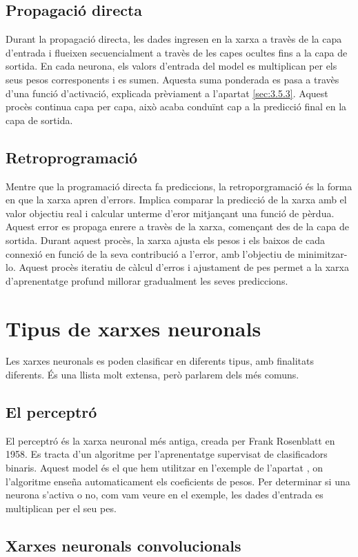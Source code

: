 \subsection{Propagació directa}
Durant la propagació directa, les dades ingresen en la xarxa a travès de la capa d'entrada i flueixen secuencialment a travès de les capes ocultes fins a la capa de sortida. En cada neurona, els valors d'entrada del model es multiplican per els seus pesos corresponents i es sumen. Aquesta suma ponderada es pasa a travès d'una funció d'activació, explicada prèviament a l'apartat \ref{sec:3.5.3}. Aquest procès continua capa per capa, això acaba conduïnt cap a la predicció final en la capa de sortida.
\subsection{Retroprogramació}\label{sec:3.6.1}
Mentre que la programació directa fa prediccions, la retroporgramació és la forma en que la xarxa apren d'errors. Implica comparar la predicció de la xarxa amb el valor objectiu real i calcular unterme d'eror mitjançant una funció de pèrdua.
Aquest error es propaga enrere a travès de la xarxa, començant des de la capa de sortida. Durant aquest procès, la xarxa ajusta els pesos i els baixos de cada connexió en funció de la seva contribució a l'error, amb l'objectiu de minimitzar-lo.
Aquest procès iteratiu de càlcul d'erros i ajustament de pes permet a la xarxa d'aprenentatge profund millorar gradualment les seves prediccions.

\section{Tipus de xarxes neuronals}
Les xarxes neuronals es poden clasificar en diferents tipus, amb finalitats diferents. És una llista molt extensa, però parlarem dels més comuns.
\subsection{El perceptró}
El perceptró és la xarxa neuronal més antiga, creada per Frank Rosenblatt en 1958. Es tracta d'un algoritme per l'aprenentatge supervisat de clasificadors binaris. Aquest model és el que hem utilitzar en l'exemple de l'apartat \label{sec:3.7}, on l'algoritme enseña automaticament els coeficients de pesos. Per determinar si una neurona s'activa o no, com vam veure en el exemple, les dades d'entrada es multiplican per el seu pes.
\subsection{Xarxes neuronals convolucionals}



